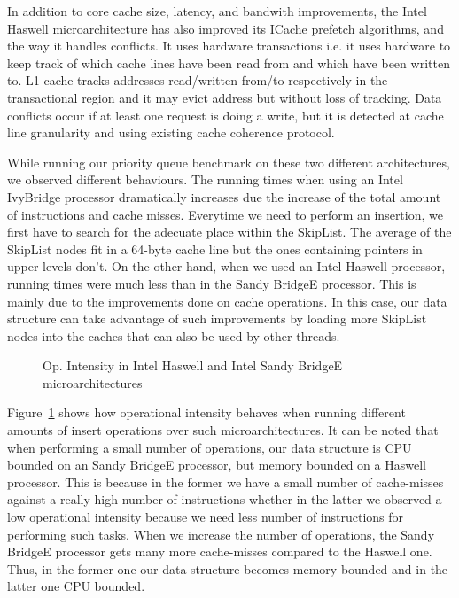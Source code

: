 In addition to core cache size, latency, and bandwith improvements, the Intel Haswell microarchitecture has also improved its ICache prefetch algorithms, and the way it handles conflicts. It uses hardware transactions i.e. it uses hardware to keep track of which cache lines have been read from and which have been written to. L1 cache tracks addresses read/written from/to respectively in the transactional region and it may evict address but without loss of tracking. Data conflicts occur if at least one request is doing a write, but it is detected at cache line granularity and using existing cache coherence protocol.

While running our priority queue benchmark on these two different architectures, we observed different behaviours. The running times when using an Intel IvyBridge processor dramatically increases due the increase of the total amount of instructions and cache misses. Everytime we need to perform an insertion, we first have to search for the adecuate place within the SkipList. The average of the SkipList nodes fit in a 64-byte cache line but the ones containing pointers in upper levels don't. On the other hand, when we used an Intel Haswell processor, running times were much less than in the Sandy BridgeE processor. This is mainly due to the improvements done on cache operations. In this case, our data structure can take advantage of such improvements by loading more SkipList nodes into the caches that can also be used by other threads.

\begin{figure}\centering
	\caption{Op. Intensity in Intel Haswell and Intel Sandy BridgeE microarchitectures}
	\label{fig:haswell_ivybridge}
\end{figure}

Figure~\ref{fig:haswell_ivybridge} shows how operational intensity behaves when running different amounts of insert operations over such microarchitectures. It can be noted that when performing a small number of operations, our data structure is CPU bounded on an Sandy BridgeE processor, but memory bounded on a Haswell processor. This is because in the former we have a small number of cache-misses against a really high number of instructions whether in the latter we observed a low operational intensity because we need less number of instructions for performing such tasks. When we increase the number of operations, the Sandy BridgeE processor gets many more cache-misses compared to the Haswell one. Thus, in the former one our data structure becomes memory bounded and in the latter one CPU bounded.